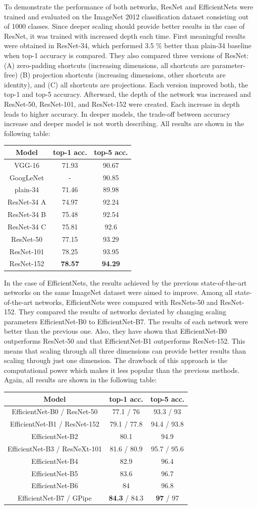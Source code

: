 \documentclass[
]{krantz}
\begin{document}
To demonstrate the performance of both networks, ResNet and EfficientNets were trained and evaluated on the ImageNet 2012 classification dataset consisting out of 1000 classes. Since deeper scaling should provide better results in the case of ResNet, it was trained with increased depth each time. First meaningful results were obtained in ResNet-34, which performed 3.5 \% better than plain-34 baseline when top-1 accuracy is compared. They also compared three versions of ResNet: (A) zero-padding shortcuts (increasing dimensions, all shortcuts are parameter-free) (B) projection shortcuts (increasing dimensions, other shortcuts are identity), and (C) all shortcuts are projections. Each version improved both, the top-1 and top-5 accuracy. Afterward, the depth of the network was increased and ResNet-50, ResNet-101, and ResNet-152 were created. Each increase in depth leads to higher accuracy. In deeper models, the trade-off between accuracy increase and deeper model is not worth describing. All results are shown in the following table:

\begin{longtable}[]{@{}ccc@{}}
\toprule
Model & top-1 acc. & top-5 acc.\tabularnewline
\midrule
\endhead
VGG-16 & 71.93 & 90.67\tabularnewline
GoogLeNet & - & 90.85\tabularnewline
plain-34 & 71.46 & 89.98\tabularnewline
ResNet-34 A & 74.97 & 92.24\tabularnewline
ResNet-34 B & 75.48 & 92.54\tabularnewline
ResNet-34 C & 75.81 & 92.6\tabularnewline
ResNet-50 & 77.15 & 93.29\tabularnewline
ResNet-101 & 78.25 & 93.95\tabularnewline
ResNet-152 & \textbf{78.57} & \textbf{94.29}\tabularnewline
\bottomrule
\end{longtable}

In the case of EfficientNets, the results achieved by the previous state-of-the-art networks on the same ImageNet dataset were aimed to improve. Among all state-of-the-art networks, EfficientNets were compared with ResNets-50 and ResNet-152. They compared the results of networks deviated by changing scaling parameters EfficientNet-B0 to EfficientNet-B7. The results of each network were better than the previous one. Also, they have shown that EfficientNet-B0 outperforms ResNet-50 and that EfficientNet-B1 outperforms ResNet-152. This means that scaling through all three dimensions can provide better results than scaling through just one dimension. The drawback of this approach is the computational power which makes it less popular than the previous methods. Again, all results are shown in the following table:

\begin{longtable}[]{@{}ccc@{}}
\toprule
Model & top-1 acc. & top-5 acc.\tabularnewline
\midrule
\endhead
EfficientNet-B0 / ResNet-50 & 77.1 / 76 & 93.3 / 93\tabularnewline
EfficientNet-B1 / ResNet-152 & 79.1 / 77.8 & 94.4 / 93.8\tabularnewline
EfficientNet-B2 & 80.1 & 94.9\tabularnewline
EfficientNet-B3 / ResNeXt-101 & 81.6 / 80.9 & 95.7 / 95.6\tabularnewline
EfficientNet-B4 & 82.9 & 96.4\tabularnewline
EfficientNet-B5 & 83.6 & 96.7\tabularnewline
EfficientNet-B6 & 84 & 96.8\tabularnewline
EfficientNet-B7 / GPipe & \textbf{84.3} / 84.3 & \textbf{97} / 97\tabularnewline
\bottomrule
\end{longtable}
\end{document}

